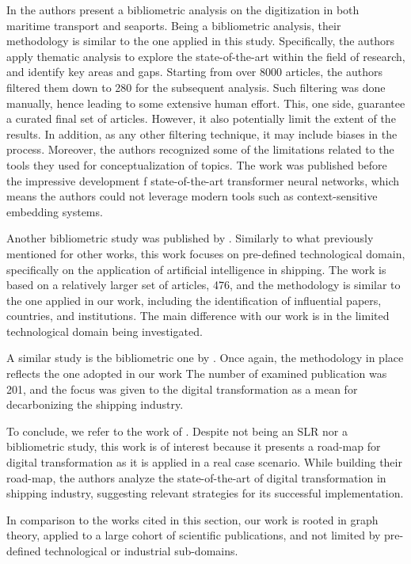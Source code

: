 \documentclass[jmse,review,submit,pdftex,moreauthors]{Definitions/mdpi}
\begin{document}
In \citep{jovic2022digitalization} the authors present a bibliometric analysis on the digitization in both maritime transport and seaports. Being a bibliometric analysis, their methodology is similar to the one applied in this study. Specifically, the authors apply thematic analysis to explore the state-of-the-art within the field of research, and identify key areas and gaps. Starting from over 8000 articles, the authors filtered them down to 280 for the subsequent analysis. Such filtering was done manually, hence leading to some extensive human effort. This, one side, guarantee a curated final set of articles. However, it also potentially limit the extent of the results. In addition, as any other filtering technique, it may include biases in the process. Moreover, the authors recognized some of the limitations related to the tools they used for conceptualization of topics. The work was published before the impressive development f state-of-the-art transformer neural networks, which means the authors could not leverage modern tools such as context-sensitive embedding systems.

Another bibliometric study was published by \citep{xiao2024application}. Similarly to what previously mentioned for other works, this work focuses on pre-defined technological domain, specifically on the application of artificial intelligence in shipping. The work is based on a relatively larger set of articles, 476, and the methodology is similar to the one applied in our work, including the identification of influential papers, countries, and institutions. The main difference with our work is in the limited technological domain being investigated.

A similar study is the bibliometric one by \citep{xiao2025application}. Once again, the methodology in place reflects the one adopted in our work The number of examined publication was 201, and the focus was given to the digital transformation as a mean for decarbonizing the shipping industry.

To conclude, we refer to the work of \citep{filippopoulos2022road}. Despite not being an SLR nor a bibliometric study, this work is of interest because it presents a road-map for digital transformation as it is applied in a real case scenario. While building their road-map, the authors analyze the state-of-the-art of digital transformation in shipping industry, suggesting relevant strategies for its successful implementation.

In comparison to the works cited in this section, our work is rooted in graph theory, applied to a large cohort of scientific publications, and not limited by pre-defined technological or industrial sub-domains.
\end{document}
